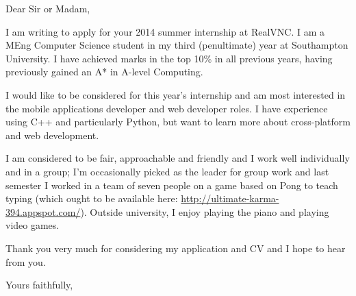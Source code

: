 \documentclass[a4paper, margin=0.3in]{letter}
\begin{document}
\begin{letter}{}

\opening{Dear Sir or Madam,}

I am writing to apply for your 2014 summer internship at RealVNC. I am a MEng Computer Science student in my third (penultimate) year at Southampton University. I have achieved marks in the top 10\% in all previous years, having previously gained an A* in A-level Computing.

I would like to be considered for this year's internship and am most interested in the mobile applications developer and web developer roles. I have experience using C++ and particularly Python, but want to learn more about cross-platform and web development.

I am considered to be fair, approachable and friendly and I work well individually and in a group; I'm occasionally picked as the leader for group work and last semester I worked in a team of seven people on a game based on Pong to teach typing (which ought to be available here: \url{http://ultimate-karma-394.appspot.com/}). Outside university, I enjoy playing the piano and playing video games.

Thank you very much for considering my application and CV and I hope to hear from you.

\closing{Yours faithfully,}

\end{letter}
\end{document}
